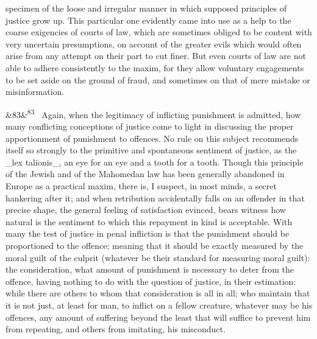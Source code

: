 \documentclass[12pt]{article}
\newcommand{\para}[1][]{\par\noindent\ifx&#1&\else\textsuperscript{\footnotesize #1}~\fi}
\begin{document}
specimen of the loose and irregular manner in which supposed principles of justice grow up. This particular one evidently came into use as a help to the coarse exigencies of courts of law, which are sometimes obliged to be content with very uncertain presumptions, on account of the greater evils which would often arise from any attempt on their part to cut finer. But even courts of law are not able to adhere consistently to the maxim, for they allow voluntary engagements to be set aside on the ground of fraud, and sometimes on that of mere mistake or misinformation.

\para[83] Again, when the legitimacy of inflicting punishment is admitted, how many conflicting conceptions of justice come to light in discussing the proper apportionment of punishment to offences. No rule on this subject recommends itself so strongly to the primitive and spontaneous sentiment of justice, as the \_lex talionis\_, an eye for an eye and a tooth for a tooth. Though this principle of the Jewish and of the Mahomedan law has been generally abandoned in Europe as a practical maxim, there is, I suspect, in most minds, a secret hankering after it; and when retribution accidentally falls on an offender in that precise shape, the general feeling of satisfaction evinced, bears witness how natural is the sentiment to which this repayment in kind is acceptable. With many the test of justice in penal infliction is that the punishment should be proportioned to the offence; meaning that it should be exactly measured by the moral guilt of the culprit (whatever be their standard for measuring moral guilt): the consideration, what amount of punishment is necessary to deter from the offence, having nothing to do with the question of justice, in their estimation: while there are others to whom that consideration is all in all; who maintain that it is not just, at least for man, to inflict on a fellow creature, whatever may be his offences, any amount of suffering beyond the least that will suffice to prevent him from repeating, and others from imitating, his misconduct.
\end{document}
